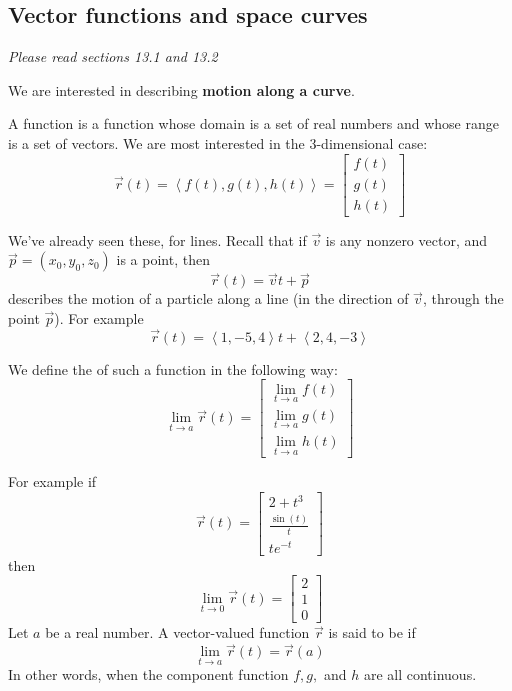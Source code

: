\documentclass[10pt]{article}
\theoremstyle{definition}
\newcommand{\1}[1]{\textbf{1}_{\left[#1\right]}} %
\newcommand{\dempfcolor}[1]{{\color{RoyalBlue}#1}}
\newcommand{\demph}[1]{\dempfcolor{{\sl #1}}}
\begin{document}
\subsection{Vector functions and space curves}
\textit{Please read sections 13.1 and 13.2}

We are interested in describing \textbf{motion along a curve}.


A \demph{vector-valued} function is a function whose domain is a set of real numbers and whose range is a
set of vectors. We are most interested in the 3-dimensional case:
\begin{equation*}
  \vec{r}(t) = \left\langle f(t),g(t),h(t) \right\rangle =
  \begin{bmatrix}
    f(t)\\g(t)\\h(t)
  \end{bmatrix}
\end{equation*}

We've already seen these, for lines. Recall that if $\vec{v}$ is any nonzero vector, and
$\vec{p}=(x_{0},y_{0},z_{0})$ is a point, then 
\begin{equation*}
  \vec{r}(t) = \vec{v}t + \vec{p}
\end{equation*}
describes the motion of a particle along a line (in the direction of $\vec{v}$, through the point
$\vec{p}$). For example
\begin{equation}\label{eq:6}
  \vec{r}(t) = \left\langle 1,-5,4 \right\rangle t + \left\langle 2,4,-3 \right\rangle 
\end{equation}

We define the \demph{limit} of such a function in the following way:
\begin{equation*}
  \lim_{t \to a} \vec{r}(t) =
  \begin{bmatrix}
    \lim_{t \to a} f(t)\\
    \lim_{t \to a} g(t)\\
    \lim_{t \to a} h(t)
  \end{bmatrix}
\end{equation*}

For example if 
\begin{equation*}
  \vec{r}(t) =
  \begin{bmatrix}
    2+t^{3}\\
    \frac{\sin(t)}{t}\\
    t e^{-t}
  \end{bmatrix}
\end{equation*}
then
\begin{equation*}
  \lim_{t\to 0}\vec{r}(t)  =
  \begin{bmatrix}
    2\\1\\0
  \end{bmatrix}
\end{equation*}
Let $a$ be a real number. A  vector-valued function $\vec{r}$ is said to be \demph{continuous at $a$} if
\begin{equation*}
  \lim_{t \to a} \vec{r}(t) = \vec{r}(a)
\end{equation*}
In other words, when the component function $f,g,$ and $h$ are all continuous.
\end{document}
